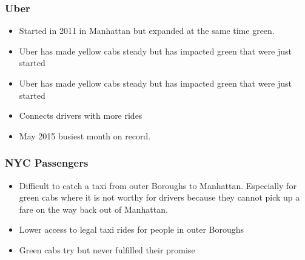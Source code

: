 \subsubsection{Uber}

\begin{itemize}
\item Started in 2011 in Manhattan but expanded at the same time green.
\item Uber has made yellow cabs steady but has impacted green that were just started 
\item Uber has made yellow cabs steady but has impacted green that were just started 
\item Connects drivers with more rides
\item May 2015 busiest month on record.


\end{itemize}


\subsubsection{NYC Passengers}

\begin{itemize}
\item Difficult to catch a taxi from outer Boroughs to Manhattan. Especially for green cabs where it is not worthy for drivers because they cannot pick up a fare on the way back out of Manhattan.
\item Lower access to legal taxi rides for people in outer Boroughs
\item Green cabs try but never fulfilled their promise


\end{itemize}
